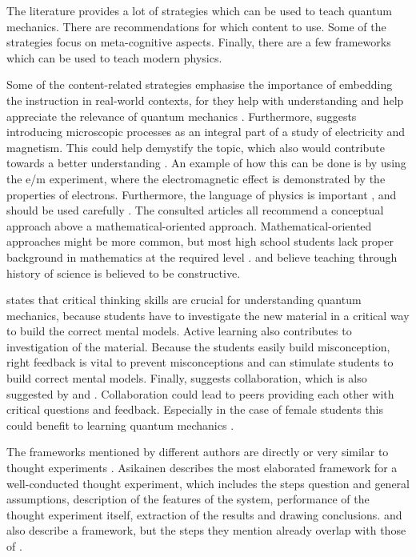 \documentclass[11pt,twoside]{report} %
\begin{document}
The literature provides a lot of strategies which can be used to teach quantum mechanics. There are recommendations for which content to use. Some of the strategies focus on meta-cognitive aspects. Finally, there are a few frameworks which can be used to teach modern physics.

Some of the content-related strategies emphasise the importance of embedding the instruction in real-world contexts, for they help with understanding \cite{mckagan,thacker,dori} and help appreciate the relevance of quantum mechanics \cite{barnes, henriksen, mckagan}. Furthermore,  suggests introducing microscopic processes as an integral part of a study of electricity and magnetism. This could help demystify the topic, which also would contribute towards a better understanding \cite{barnes, muller}. An example of how this can be done is by using the e/m experiment, where the electromagnetic effect is demonstrated by the properties of electrons. Furthermore, the language of physics is important \cite{henriksen}, and should be used carefully \cite{mckagan}. The consulted articles all recommend a conceptual approach above a mathematical-oriented approach. Mathematical-oriented approaches might be more common, but most high school students lack proper background in mathematics at the required level \cite{dori}.  and  believe teaching through history of science is believed to be constructive.

 states that critical thinking skills are crucial for understanding quantum mechanics, because students have to investigate the new material in a critical way to build the correct mental models. Active learning also contributes to investigation of the material. Because the students easily build misconception, right feedback is vital to prevent misconceptions and can stimulate students to build correct mental models. Finally,  suggests collaboration, which is also suggested by  and . Collaboration could lead to peers providing each other with critical questions and feedback. Especially in the case of female students this could benefit to learning quantum mechanics \cite{adegoke}. 

The frameworks mentioned by different authors are directly or very similar to thought experiments \cite{asikainen, erduran, levrini, velentzas}. Asikainen describes the most elaborated framework for a well-conducted thought experiment, which includes the steps question and general assumptions, description of the features of the system, performance of the thought experiment itself, extraction of the results and drawing conclusions.  and  also describe a framework, but the steps they mention already overlap with those of .
\end{document}
